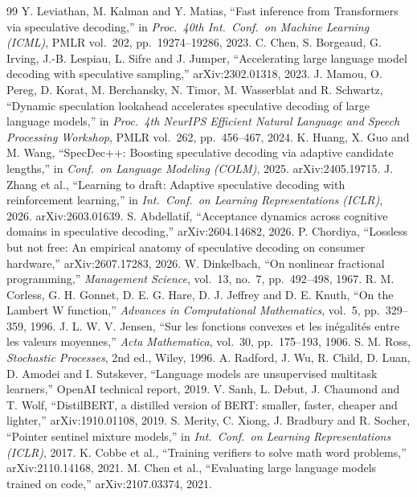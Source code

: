 \documentclass[11pt,letterpaper]{article}
\begin{document}
\newpage
\begin{thebibliography}{99}\small
\setlength{\itemsep}{2pt}
 Y. Leviathan, M. Kalman and Y. Matias, ``Fast inference from Transformers via speculative decoding,'' in \emph{Proc.\ 40th Int.\ Conf.\ on Machine Learning (ICML)}, PMLR vol.~202, pp.~19274--19286, 2023.
 C. Chen, S. Borgeaud, G. Irving, J.-B. Lespiau, L. Sifre and J. Jumper, ``Accelerating large language model decoding with speculative sampling,'' arXiv:2302.01318, 2023.
 J. Mamou, O. Pereg, D. Korat, M. Berchansky, N. Timor, M. Wasserblat and R. Schwartz, ``Dynamic speculation lookahead accelerates speculative decoding of large language models,'' in \emph{Proc.\ 4th NeurIPS Efficient Natural Language and Speech Processing Workshop}, PMLR vol.~262, pp.~456--467, 2024.
 K. Huang, X. Guo and M. Wang, ``SpecDec++: Boosting speculative decoding via adaptive candidate lengths,'' in \emph{Conf.\ on Language Modeling (COLM)}, 2025. arXiv:2405.19715.
 J. Zhang et al., ``Learning to draft: Adaptive speculative decoding with reinforcement learning,'' in \emph{Int.\ Conf.\ on Learning Representations (ICLR)}, 2026. arXiv:2603.01639.
 S. Abdellatif, ``Acceptance dynamics across cognitive domains in speculative decoding,'' arXiv:2604.14682, 2026.
 P. Chordiya, ``Lossless but not free: An empirical anatomy of speculative decoding on consumer hardware,'' arXiv:2607.17283, 2026.
 W. Dinkelbach, ``On nonlinear fractional programming,'' \emph{Management Science}, vol.~13, no.~7, pp.~492--498, 1967.
 R. M. Corless, G. H. Gonnet, D. E. G. Hare, D. J. Jeffrey and D. E. Knuth, ``On the Lambert W function,'' \emph{Advances in Computational Mathematics}, vol.~5, pp.~329--359, 1996.
 J. L. W. V. Jensen, ``Sur les fonctions convexes et les in\'egalit\'es entre les valeurs moyennes,'' \emph{Acta Mathematica}, vol.~30, pp.~175--193, 1906.
 S. M. Ross, \emph{Stochastic Processes}, 2nd ed., Wiley, 1996.
 A. Radford, J. Wu, R. Child, D. Luan, D. Amodei and I. Sutskever, ``Language models are unsupervised multitask learners,'' OpenAI technical report, 2019.
 V. Sanh, L. Debut, J. Chaumond and T. Wolf, ``DistilBERT, a distilled version of BERT: smaller, faster, cheaper and lighter,'' arXiv:1910.01108, 2019.
 S. Merity, C. Xiong, J. Bradbury and R. Socher, ``Pointer sentinel mixture models,'' in \emph{Int.\ Conf.\ on Learning Representations (ICLR)}, 2017.
 K. Cobbe et al., ``Training verifiers to solve math word problems,'' arXiv:2110.14168, 2021.
 M. Chen et al., ``Evaluating large language models trained on code,'' arXiv:2107.03374, 2021.
\end{thebibliography}
\end{document}
